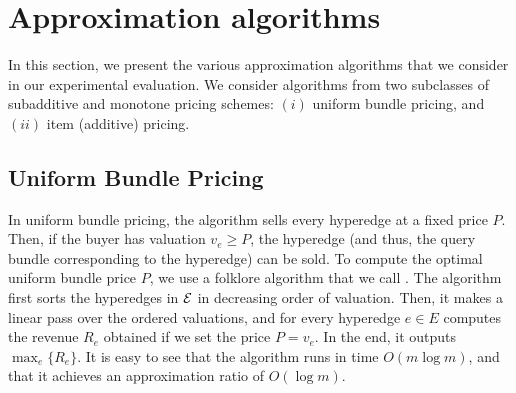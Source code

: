 \section{Approximation algorithms}
\label{section-approxalgo}

In this section, we present the various approximation algorithms that we consider in our experimental evaluation. We consider algorithms from two subclasses of subadditive and monotone pricing schemes: $(i)$ uniform bundle pricing, and $(ii)$ item (additive) pricing.

\subsection{Uniform Bundle Pricing} 
\label{subsection-uniformbundle}

In uniform bundle pricing, the algorithm sells every hyperedge at a fixed price $P$. Then, if the buyer has valuation $v_e \geq P$, the hyperedge (and thus, the query bundle corresponding to the hyperedge) can be sold. 
To compute the optimal uniform bundle price $P$, we use a folklore algorithm that we call \ubp . The algorithm first sorts the hyperedges in $\mathcal{E}$
in decreasing order of valuation. Then, it makes a linear pass over the ordered valuations, and for every hyperedge $e \in E$ computes the revenue $R_e$ obtained
if we set the price $P = v_e$. In the end, it outputs $\max_e \{R_e\}$. It is easy to see that the algorithm runs in time $O(m \log m)$, and that it achieves an approximation
ratio of $O(\log m)$.


